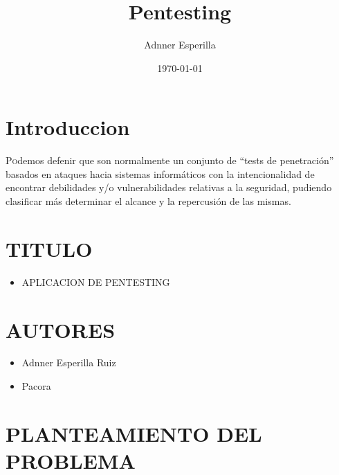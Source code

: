 \documentclass[twoside,twocolumn]{article}
\title{ Pentesting} %
\author{Adnner Esperilla }
\date{\today} %
\begin{document}
\maketitle


\section{Introduccion}

\lettrine[nindent=0em,lines=3]{P}odemos defenir que son normalmente un conjunto de “tests de penetración” basados en ataques hacia sistemas informáticos con la intencionalidad de encontrar debilidades y/o vulnerabilidades relativas a la seguridad, pudiendo clasificar más determinar el alcance y la repercusión de las mismas.

\section{TITULO}
\begin{itemize}
\item APLICACION DE PENTESTING
\end{itemize}
\section{AUTORES}
\begin{itemize}
\item Adnner Esperilla Ruiz
\item Pacora
\end{itemize}
\section{PLANTEAMIENTO DEL PROBLEMA}
\end{document}
